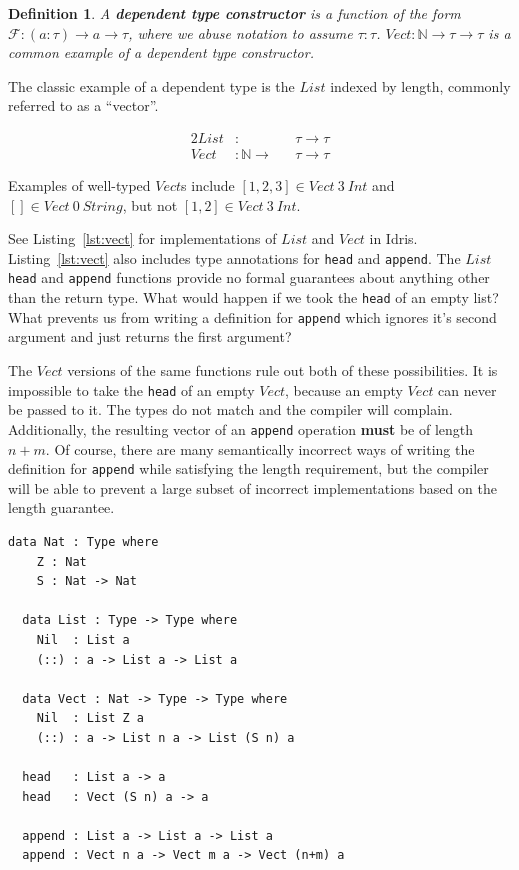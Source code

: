 \documentclass[12pt]{article}
\newtheorem{defn}{Definition}[section]
\begin{document}
\begin{defn}
  A \textbf{dependent type constructor} is a function of the form
  $\mathcal{F} : (a : \tau) \rightarrow a \rightarrow \tau$, where we abuse notation to assume $\tau : \tau$.
  $Vect : \mathbb{N} \rightarrow \tau \rightarrow \tau$ is a common example of a dependent type constructor.
\end{defn}

The classic example of a dependent type is the $List$ indexed by length, commonly referred to as a ``vector''.

\begin{alignat*}{2}
  List &:                        &&\tau \rightarrow \tau \\
  Vect &: \mathbb{N} \rightarrow &&\tau \rightarrow \tau
\end{alignat*}


Examples of well-typed $Vect$s include $[1,2,3]\in Vect\ 3\ Int$ and $[]\in Vect\ 0\ String$, but not $[1,2]\in Vect\ 3\ Int$.

See Listing~\ref{lst:vect} for implementations of $List$ and $Vect$ in Idris.
Listing~\ref{lst:vect} also includes type annotations for \texttt{head} and \texttt{append}.
The $List$ \texttt{head} and \texttt{append} functions provide no formal guarantees about anything other than the return type.
What would happen if we took the \texttt{head} of an empty list?
What prevents us from writing a definition for \texttt{append} which ignores it's second argument and just returns the first argument?

The $Vect$ versions of the same functions rule out both of these possibilities.
It is impossible to take the \texttt{head} of an empty $Vect$, because an empty $Vect$ can never be passed to it.
The types do not match and the compiler will complain.
Additionally, the resulting vector of an \texttt{append} operation \textbf{must} be of length $n+m$.
Of course, there are many semantically incorrect ways of writing the definition for \texttt{append} while satisfying the length requirement, but the compiler will be able to prevent a large subset of incorrect implementations based on the length guarantee.

\begin{lstlisting}[caption=List and Vect,label={lst:vect}]
  data Nat : Type where
    Z : Nat
    S : Nat -> Nat

  data List : Type -> Type where
    Nil  : List a
    (::) : a -> List a -> List a

  data Vect : Nat -> Type -> Type where
    Nil  : List Z a
    (::) : a -> List n a -> List (S n) a

  head   : List a -> a
  head   : Vect (S n) a -> a

  append : List a -> List a -> List a
  append : Vect n a -> Vect m a -> Vect (n+m) a
\end{lstlisting}
\end{document}
